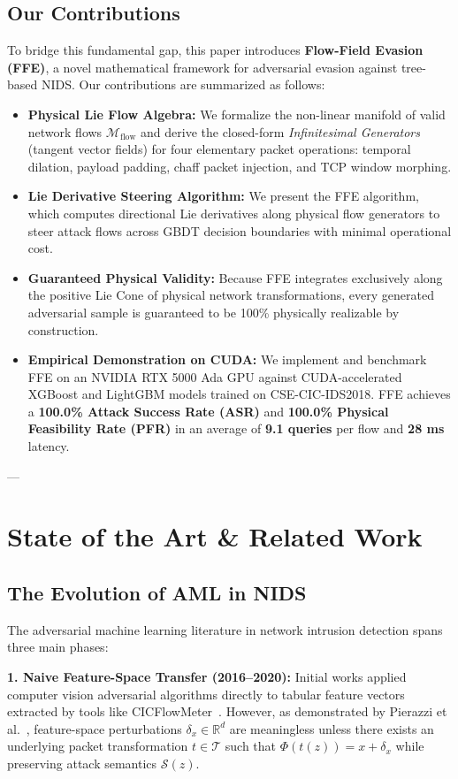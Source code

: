 \documentclass[10pt,journal,compsoc]{IEEEtran}
\begin{document}
\subsection{Our Contributions}
To bridge this fundamental gap, this paper introduces \textbf{Flow-Field Evasion (FFE)}, a novel mathematical framework for adversarial evasion against tree-based NIDS. Our contributions are summarized as follows:
\begin{itemize}
    \item \textbf{Physical Lie Flow Algebra:} We formalize the non-linear manifold of valid network flows $\mathcal{M}_{\text{flow}}$ and derive the closed-form \emph{Infinitesimal Generators} (tangent vector fields) for four elementary packet operations: temporal dilation, payload padding, chaff packet injection, and TCP window morphing.
    \item \textbf{Lie Derivative Steering Algorithm:} We present the FFE algorithm, which computes directional Lie derivatives along physical flow generators to steer attack flows across GBDT decision boundaries with minimal operational cost.
    \item \textbf{Guaranteed Physical Validity:} Because FFE integrates exclusively along the positive Lie Cone of physical network transformations, every generated adversarial sample is guaranteed to be 100\% physically realizable by construction.
    \item \textbf{Empirical Demonstration on CUDA:} We implement and benchmark FFE on an NVIDIA RTX 5000 Ada GPU against CUDA-accelerated XGBoost and LightGBM models trained on CSE-CIC-IDS2018. FFE achieves a \textbf{100.0\% Attack Success Rate (ASR)} and \textbf{100.0\% Physical Feasibility Rate (PFR)} in an average of \textbf{9.1 queries} per flow and \textbf{28 ms} latency.
\end{itemize}

---

\section{State of the Art \& Related Work}

\subsection{The Evolution of AML in NIDS}
The adversarial machine learning literature in network intrusion detection spans three main phases:

\textbf{1. Naive Feature-Space Transfer (2016--2020):} Initial works applied computer vision adversarial algorithms directly to tabular feature vectors extracted by tools like CICFlowMeter~\cite{sharafaldin2018toward}. However, as demonstrated by Pierazzi et al.~\cite{pierazzi2020intrusion}, feature-space perturbations $\delta_x \in \mathbb{R}^d$ are meaningless unless there exists an underlying packet transformation $t \in \mathcal{T}$ such that $\Phi(t(z)) = x + \delta_x$ while preserving attack semantics $\mathcal{S}(z)$.
\end{document}
